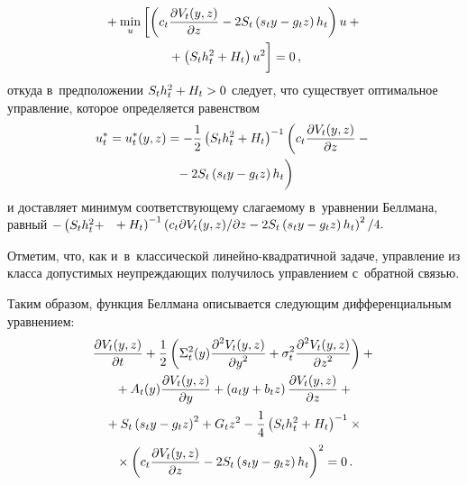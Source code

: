 \begin{multicols}{2}
\noindent
\begin{multline*}
     {}+\min\limits_u \left[ \left( c_t \fr{\partial V_t(y,z)}{\partial z}-2S_t \left( 
s_t y-g_t z\right) h_t\right)u +{}\right.\\
\left.{}+\left( S_t h_t^2+H_t\right) u^2
\vphantom{\fr{\partial V_t(y,z)}{\partial z}}
\right]=0\,,
     \end{multline*}
откуда в~предположении $S_t h_t^2\hm+ H_t\hm>0$ следует, что существует 
оптимальное управ\-ле\-ние, которое определяется равенством
\begin{multline}
u_t^* = u_t^*(y,z)=-\fr{1}{2}\left( S_t h_t^2 +H_t\right)^{-1} \left( c_t 
\fr{\partial V_t(y,z)}{\partial z}-{}\right.\\
\left.{}-2S_t\left( s_t y-g_t z\right) h_t
\vphantom{\fr{\partial V_t(y,z)}{\partial z}}
\right)
\label{e12-bos}
\end{multline}
и доставляет минимум соответствующему сла\-га\-емо\-му в~урав\-не\-нии Беллмана, 
равный
$-\left( S_t h_t^2\hm+\right.$\linebreak
$\left.{}+H_t\right)^{-1} \left( c_t 
{\partial V_t(y,z)}/{\partial 
z}\hm-2S_t\left( s_t y \hm-g_t z\right) h_t \right)^2/4.
$ 
     
     Отметим, что, как и~в~классической ли\-ней\-но-квад\-ра\-тич\-ной 
задаче, управ\-ле\-ние из класса до\-пус\-ти\-мых не\-упреж\-да\-ющих получилось 
управ\-ле\-ни\-ем с~обратной связью.
     
     Таким образом, функция Беллмана описывается сле\-ду\-ющим 
дифференциальным уравнением:
     \begin{multline}
     \displaystyle\frac{\displaystyle \partial V_t(y,z)\mathstrut}{\displaystyle \partial t\mathstrut} +\displaystyle\frac{\displaystyle 1\mathstrut}{\displaystyle 2\mathstrut}\left( \Sigma_t^2(y) \displaystyle\frac{\displaystyle \partial^2 
V_t(y,z)\mathstrut}{\displaystyle \partial y^2\mathstrut}+\sigma_t^2\displaystyle\frac{\displaystyle \partial^2 V_t(y,z)\mathstrut}{\displaystyle \partial 
z^2\mathstrut}\right)+{}\\
     {}+ A_t(y) \displaystyle\frac{\displaystyle \partial V_t(y,z)\mathstrut}{\displaystyle \partial y\mathstrut}+\left( a_t y+b_t z\right) 
\displaystyle\frac{\displaystyle \partial V_t(y,z)\mathstrut}{\displaystyle \partial z\mathstrut}+{}\\
{}+ S_t \left( s_t y- g_t z\right)^2 +G_t z^2-
 \displaystyle\frac{\displaystyle 1\mathstrut}{\displaystyle 4\mathstrut}\left( S_t h_t^2+H_t\right)^{-1}\times{}\\
 {}\times \left( c_t \displaystyle\frac{\displaystyle \partial V_t(y,z)\mathstrut}{\displaystyle \partial z\mathstrut}-2S_t\left( s_t y -g_t z\right) h_t \right)^2=0\,.
     \label{e13-bos}
     \end{multline}
     

\end{multicols}
